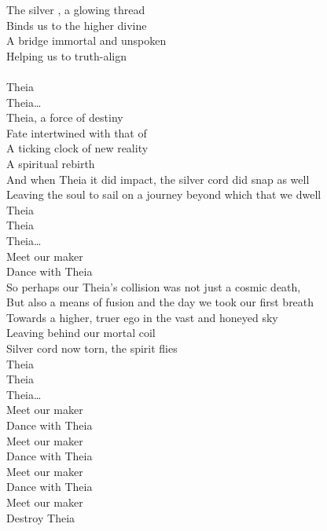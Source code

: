



The silver , a glowing thread \\
Binds us to the higher divine \\
A bridge immortal and unspoken \\
Helping us to truth-align \\

 \\
Theia \\
Theia… \\

Theia, a force of destiny \\
Fate intertwined with that of  \\
A ticking clock of new reality \\
A spiritual rebirth \\
And when Theia it did impact, the silver cord did snap as well \\
Leaving the soul to sail on a journey beyond which that we dwell \\

Theia \\
Theia \\
Theia… \\

Meet our maker \\
Dance with Theia \\

So perhaps our Theia's collision was not just a cosmic death, \\
But also a means of fusion and the day we took our first breath \\
Towards a higher, truer ego in the vast and honeyed sky \\
Leaving behind our mortal coil \\
Silver cord now torn, the spirit flies \\

Theia \\
Theia \\
Theia… \\

Meet our maker \\
Dance with Theia \\
Meet our maker \\
Dance with Theia \\
Meet our maker \\
Dance with Theia \\
Meet our maker \\
Destroy Theia \\

